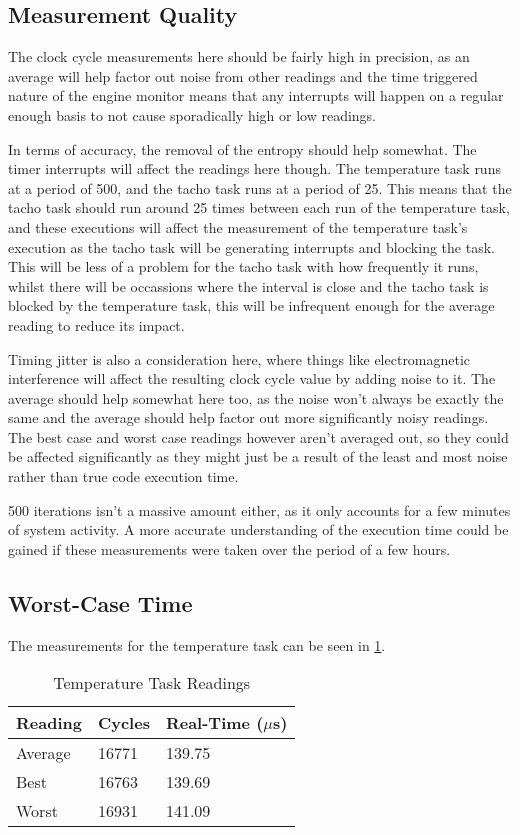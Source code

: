 \documentclass[]{report}
\begin{document}
			\subsection{Measurement Quality}
			The clock cycle measurements here should be fairly high in precision, as an average will help factor out noise from other readings and the time triggered nature of the engine monitor means that any interrupts will happen on a regular enough basis to not cause sporadically high or low readings.
			\medskip
			
			In terms of accuracy, the removal of the entropy should help somewhat. The timer interrupts will affect the readings here though. The temperature task runs at a period of 500, and the tacho task runs at a period of 25. This means that the tacho task should run around 25 times between each run of the temperature task, and these executions will affect the measurement of the temperature task's execution as the tacho task will be generating interrupts and blocking the task. This will be less of a problem for the tacho task with how frequently it runs, whilst there will be occassions where the interval is close and the tacho task is blocked by the temperature task, this will be infrequent enough for the average reading to reduce its impact. 
			
			Timing jitter is also a consideration here, where things like electromagnetic interference will affect the resulting clock cycle value by adding noise to it. The average should help somewhat here too, as the noise won't always be exactly the same and the average should help factor out more significantly noisy readings. The best case and worst case readings however aren't averaged out, so they could be affected significantly as they might just be a result of the least and most noise rather than true code execution time.
			
			500 iterations isn't a massive amount either, as it only accounts for a few minutes of system activity. A more accurate understanding of the execution time could be gained if these measurements were taken over the period of a few hours.
			
			\subsection{Worst-Case Time}
			The measurements for the temperature task can be seen in \ref{executionmeasurementstemp}.
			
			\begin{table}[h]
				\centering
				\begin{tabular}{| l | l | l |} 
					\hline
					Reading & Cycles & Real-Time ($\mu $s) \\ [0.5ex] 
					\hline
					Average  & 16771 & 139.75 \\ 
					Best & 16763 & 139.69 \\
					Worst & 16931 & 141.09 \\
					\hline
				\end{tabular}
				\caption{Temperature Task Readings}
				\label{executionmeasurementstemp}
			\end{table}
		
\end{document}
